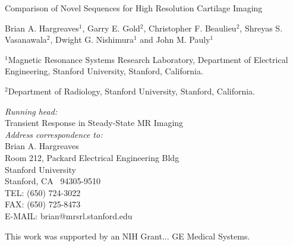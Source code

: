 
%
%
%


\begin{titlepage}

\begin{center}
	\begin{Large}
		\begin{bf}
Comparison of Novel Sequences for High Resolution
Cartilage Imaging
\\ [0.1in]
		\end{bf}
	\end{Large}
\end{center}
\bigskip
\begin{center}
Brian A. Hargreaves$^1$, Garry E. Gold$^2$, 
Christopher F. Beaulieu$^2$, Shreyas S. Vasanawala$^2$, 
Dwight G. Nishimura$^1$ and John M. Pauly$^1$

\end{center}
\vspace*{0.1in}
\noindent
$^1$Magnetic Resonance Systems Research Laboratory,
Department of Electrical Engineering,
Stanford University, Stanford, California.  

$^2$Department of Radiology,
Stanford University, Stanford, California.  

\noindent
{\em Running head:} \\
Transient Response in Steady-State MR Imaging\\ [0.1in]
{\em Address correspondence to:} \\
	Brian A. Hargreaves \\
	Room 212, Packard Electrical Engineering Bldg \\
        Stanford University \\
	Stanford, CA \ 94305-9510 \\
	TEL: (650) 724-3022 \\
	FAX: (650) 725-8473 \\
E-MAIL: brian@mrsrl.stanford.edu


\noindent
This work was supported by an NIH Grant...
GE Medical Systems.


\noindent

\end{titlepage}





